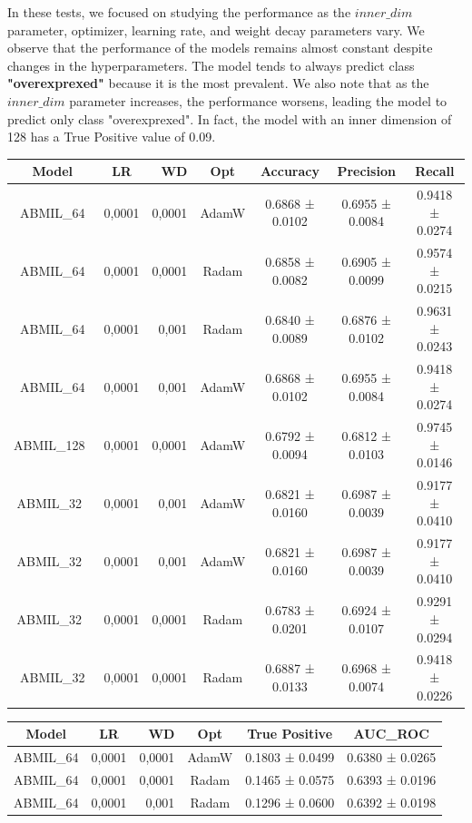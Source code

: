 \documentclass{article}
\begin{document}
In these tests, we focused on studying the performance as the $inner\_dim$ parameter, optimizer, learning rate, and weight decay parameters vary. We observe that the performance of the models remains almost constant despite changes in the hyperparameters. The model tends to always predict class \textbf{"overexprexed"}  because it is the most prevalent. We also note that as the $inner\_dim$ parameter increases, the performance worsens, leading the model to predict only class "overexprexed". In fact, the model with an inner dimension of 128 has a True Positive value of 0.09.

\begin{table}[h]
	\centering
	\begin{tabular}{|c|crc|c|c|c|}
		\hline
		Model & LR & WD & Opt & Accuracy & Precision & Recall\\
		\hline
		ABMIL\_64 & 0,0001 & 0,0001 & AdamW & 0.6868 ± 0.0102 & 0.6955 ± 0.0084 & 0.9418 ± 0.0274 \\
		ABMIL\_64 & 0,0001 & 0,0001 & Radam & 0.6858 ± 0.0082 & 0.6905 ± 0.0099 & 0.9574 ± 0.0215 \\
		ABMIL\_64 & 0,0001 & 0,001 & Radam & 0.6840 ± 0.0089 & 0.6876 ± 0.0102 & 0.9631 ± 0.0243\\
		ABMIL\_64 & 0,0001 & 0,001 & AdamW & 0.6868 ± 0.0102 & 0.6955 ± 0.0084 & 0.9418 ± 0.0274\\
		ABMIL\_128\ & 0,0001 & 0,0001 & AdamW & 0.6792 ± 0.0094 & 0.6812 ± 0.0103 & 0.9745 ± 0.0146 \\
		ABMIL\_32\ & 0,0001 & 0,001 & AdamW & 0.6821 ± 0.0160 & 0.6987 ± 0.0039 & 0.9177 ± 0.0410 \\
		ABMIL\_32\ & 0,0001 & 0,001 & AdamW & 0.6821 ± 0.0160 & 0.6987 ± 0.0039 & 0.9177 ± 0.0410\\
		ABMIL\_32\ & 0,0001 & 0,0001 & Radam & 0.6783 ± 0.0201 & 0.6924 ± 0.0107 & 0.9291 ± 0.0294\\
		ABMIL\_32 & 0,0001 & 0,0001 & Radam & 0.6887 ± 0.0133 & 0.6968 ± 0.0074 & 0.9418 ± 0.0226\\
		\hline
	\end{tabular}
	\centering
	\begin{tabular}{|c|crc|c|c|}
		\hline
		Model & LR & WD & Opt & True Positive & AUC\_ROC\\
		\hline
		ABMIL\_64 & 0,0001 & 0,0001 & AdamW & 0.1803 ± 0.0499 &0.6380 ± 0.0265  \\
		ABMIL\_64 & 0,0001 & 0,0001 & Radam & 0.1465 ± 0.0575& 0.6393 ± 0.0196\\
		ABMIL\_64 & 0,0001 & 0,001 & Radam & 0.1296 ± 0.0600 & 0.6392 ± 0.0198\\

\end{tabular}
\end{table}
\end{document}
